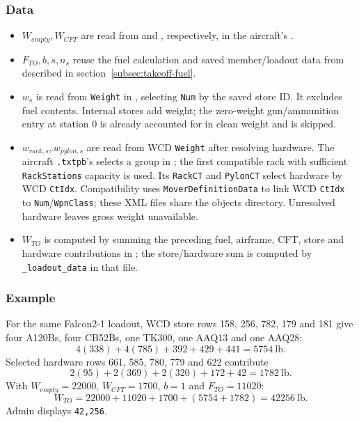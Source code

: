 \documentclass[10pt,a4paper]{amsart}
\begin{document}
\subsubsection*{Data}
\begin{itemize}
\setlength{\itemsep}{0pt}
\setlength{\parsep}{0pt}
\item $W_{empty},W_{CFT}$ are read from 
and , respectively, in the aircraft's
.
\item $F_{TO},b,s,n_s$ reuse the fuel calculation and saved member/loadout
data from  described in section~\ref{subsec:takeoff-fuel}.
\item $w_s$ is read from \texttt{Weight} in
, selecting \texttt{Num} by the
saved store ID. It excludes fuel contents. Internal stores add weight;
the zero-weight gun/ammunition entry at station 0 is already accounted
for in clean weight and is skipped.
\item $w_{rack,s},w_{pylon,s}$ are read from WCD \texttt{Weight} after
resolving hardware. The aircraft \texttt{.txtpb}'s
 selects a group in
; the first compatible rack with
sufficient \texttt{RackStations} capacity is used. Its \texttt{RackCT}
and \texttt{PylonCT} select hardware by WCD \texttt{CtIdx}.
Compatibility uses  \texttt{MoverDefinitionData}
to link WCD \texttt{CtIdx} to 
\texttt{Num}/\texttt{WpnClass}; these XML files share the objects directory.
Unresolved hardware leaves gross weight unavailable.
\item $W_{TO}$ is computed by summing the preceding fuel, airframe,
CFT, store and hardware contributions in
; the store/hardware
sum is computed by \texttt{\_loadout\_data} in that file.
\end{itemize}

\subsubsection*{Example}
For the same Falcon2-1 loadout, WCD store rows 158, 256, 782, 179 and 181
give four A120Bs, four CB52Bs, one TK300, one AAQ13 and one AAQ28:
\[
 4(338)+4(785)+392+429+441=5754\ \text{lb}.
\]
Selected hardware rows 661, 585, 780, 779 and 622 contribute
\[
 2(95)+2(369)+2(320)+172+42=1782\ \text{lb}.
\]
With $W_{empty}=22000$, $W_{CFT}=1700$, $b=1$ and $F_{TO}=11020$:
\[
 W_{TO}=22000+11020+1700+(5754+1782)=42256\ \text{lb}.
\]
Admin displays \texttt{42,256}.
\end{document}
